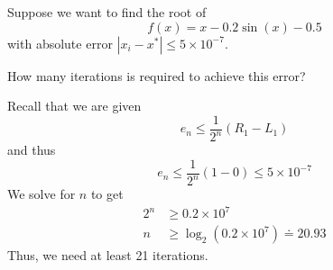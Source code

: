 \begin{example}
    Suppose we want to find the root of \[
        f(x) = x - 0.2 \sin(x) - 0.5
    \] with absolute error \( | x_i - x^\ast | \leq 5 \times 10^{-7} \).

    How many iterations is required to achieve this error?

    Recall that we are given \[
        e_n \leq \frac{1}{2^n} ( R_1 - L_1 )
    \] and thus \[
        e_n \leq \frac{1}{2^n} (1 - 0) \leq 5 \times 10^{-7}
    \] We solve for \( n \) to get \begin{align*}
        2^n
         & \geq 0.2 \times 10^7
        \\
        n
         & \geq \log_2 \left( 0.2 \times 10^7 \right) \doteq 20.93
    \end{align*}
    Thus, we need at least 21 iterations.


\end{example}
